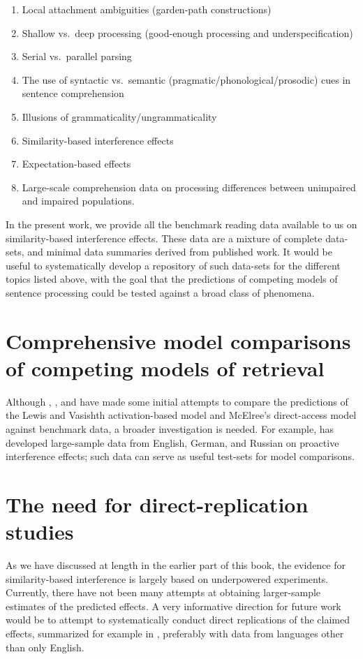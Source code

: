 \documentclass{cambridge7A}\usepackage[]{graphicx}\usepackage[]{color}
\begin{document}
\begin{enumerate}
\item Local attachment ambiguities (garden-path constructions)
\item Shallow vs.\ deep processing (good-enough processing and underspecification)
\item Serial vs.\ parallel parsing
\item The use of syntactic vs.\ semantic (pragmatic/phonological/prosodic) cues in sentence comprehension
\item Illusions of grammaticality/ungrammaticality
\item Similarity-based interference effects
\item Expectation-based effects
\item Large-scale comprehension data on processing differences between unimpaired and impaired populations.
\end{enumerate}

In the present work, we provide  all the benchmark reading data available to us on similarity-based interference effects. These data are a mixture of complete data-sets, and minimal data summaries derived from published work. It would be useful to systematically develop a repository of such data-sets for the different topics listed above, with the goal that the predictions of competing models of sentence processing could be tested against a broad class of phenomena.

\section{Comprehensive model comparisons of competing models of retrieval}

Although \cite{NicenboimRetrieval2018}, \cite{VasishthChopinRyderNicenboimCogSci2017}, and \cite{LissonEtAl2020} have made some initial attempts to compare the predictions of the Lewis and Vasishth activation-based model and McElree's direct-access model against benchmark data, a broader investigation is needed. For example, \cite{MertzenEtAlAMLaP2019} has developed large-sample data from English, German, and Russian on proactive interference effects; such data can serve as useful test-sets for model comparisons.

\section{The need for direct-replication studies}

As we have discussed at length in the earlier part of this book, the evidence for similarity-based interference is largely based on underpowered experiments. Currently, there have not been many attempts at obtaining larger-sample estimates of the predicted effects. A very informative direction for future work would be to attempt to systematically conduct direct replications of the claimed effects, summarized for example in \cite{JaegerEngelmannVasishth2017}, preferably with data from languages other than only English.
\end{document}
